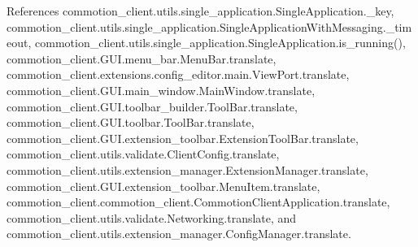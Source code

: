 References commotion\-\_\-client.\-utils.\-single\-\_\-application.\-Single\-Application.\-\_\-key, commotion\-\_\-client.\-utils.\-single\-\_\-application.\-Single\-Application\-With\-Messaging.\-\_\-timeout, commotion\-\_\-client.\-utils.\-single\-\_\-application.\-Single\-Application.\-is\-\_\-running(), commotion\-\_\-client.\-G\-U\-I.\-menu\-\_\-bar.\-Menu\-Bar.\-translate, commotion\-\_\-client.\-extensions.\-config\-\_\-editor.\-main.\-View\-Port.\-translate, commotion\-\_\-client.\-G\-U\-I.\-main\-\_\-window.\-Main\-Window.\-translate, commotion\-\_\-client.\-G\-U\-I.\-toolbar\-\_\-builder.\-Tool\-Bar.\-translate, commotion\-\_\-client.\-G\-U\-I.\-toolbar.\-Tool\-Bar.\-translate, commotion\-\_\-client.\-G\-U\-I.\-extension\-\_\-toolbar.\-Extension\-Tool\-Bar.\-translate, commotion\-\_\-client.\-utils.\-validate.\-Client\-Config.\-translate, commotion\-\_\-client.\-utils.\-extension\-\_\-manager.\-Extension\-Manager.\-translate, commotion\-\_\-client.\-G\-U\-I.\-extension\-\_\-toolbar.\-Menu\-Item.\-translate, commotion\-\_\-client.\-commotion\-\_\-client.\-Commotion\-Client\-Application.\-translate, commotion\-\_\-client.\-utils.\-validate.\-Networking.\-translate, and commotion\-\_\-client.\-utils.\-extension\-\_\-manager.\-Config\-Manager.\-translate.


